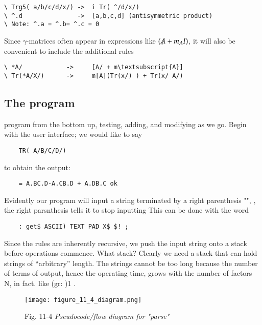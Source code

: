 \begin{verbatim}
\ Trg5( a/b/c/d/x/) ->  i Tr( ^/d/x/)
\ ^.d               ->  [a,b,c,d] (antisymmetric product)
\ Note: ^.a = ^.b= ^.c = 0
\end{verbatim}

Since $\gamma$-matrices often appear in expressions like $(\tr{A} + m_{A}I)$, it will also be convenient to include the additional rules

\begin{Verbatim}[commandchars=\\\{\}]
\ *A/            ->     [A/ + m\textsubscript{A}]
\ Tr(*A/X/)      ->     m[A](Tr(x/) ) + Tr(x/ A/)
\end{Verbatim}

\subsection{The program}
 program from the bottom up, testing, adding, and modifying as we go. Begin with the user interface; we would like to say

\begin{lstlisting}
    TR( A/B/C/D/)
\end{lstlisting}

to obtain the output:

\begin{lstlisting}
    = A.BC.D-A.CB.D + A.DB.C ok
\end{lstlisting}

Evidently our program will input a string terminated by a right parenthesis "\bc{)}", \ie, the right parsnthesis tells it to stop inputting This can be done with the word

\begin{lstlisting}
    : get$ ASCII) TEXT PAD X$ $! ;
\end{lstlisting}

Since the rules are inherently recursive, we push the input string onto a stack before operations commence. What stack? Clearly we need a stack that can hold strings of “arbitrary” length. The strings cannot be too long because the number of terms of output, hence the operating time, grows with the number of factors N, in fact. like (gr: )1 .

\begin{figure}
    \texttt{[image: figure\_11\_4\_diagram.png]}
    \caption{Fig. 11-4 \textit{Pseudocode/flow diagram for "parse"}}
    \label{fig:11_04}
\end{figure}

